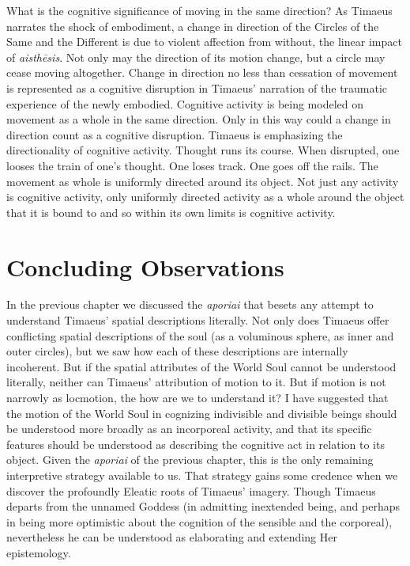 What is the cognitive significance of moving in the same direction? As Timaeus narrates the shock of embodiment, a change in direction of the Circles of the Same and the Different is due to violent affection from without, the linear impact of \emph{aisthēsis}. Not only may the direction of its motion change, but a circle may cease moving altogether. Change in direction no less than cessation of movement is represented as a cognitive disruption in Timaeus' narration of the traumatic experience of the newly embodied. Cognitive activity is being modeled on movement as a whole in the same direction. Only in this way could a change in direction count as a cognitive disruption. Timaeus is emphasizing the directionality of cognitive activity. Thought runs its course. When disrupted, one looses the train of one's thought. One loses track. One goes off the rails. The movement as whole is uniformly directed around its object. Not just any activity is cognitive activity, only uniformly directed activity as a whole around the object that it is bound to and so within its own limits is cognitive activity.


  



\section{Concluding Observations} %
\label{sec:concluding_observations_cr}

In the previous chapter we discussed the \emph{aporiai} that besets any attempt to understand Timaeus' spatial descriptions literally. Not only does Timaeus offer conflicting spatial descriptions of the soul (as a voluminous sphere, as inner and outer circles), but we saw how each of these descriptions are internally incoherent. But if the spatial attributes of the World Soul cannot be understood literally, neither can Timaeus' attribution of motion to it. But if motion is not narrowly as locmotion, the how are we to understand it? I have suggested that the motion of the World Soul in cognizing indivisible and divisible beings should be understood more broadly as an incorporeal activity, and that its specific features should be understood as describing the cognitive act in relation to its object. Given the \emph{aporiai} of the previous chapter, this is the only remaining interpretive strategy available to us. That strategy gains some credence when we discover the profoundly Eleatic roots of Timaeus' imagery. Though Timaeus departs from the unnamed Goddess (in admitting inextended being, and perhaps in being more optimistic about the cognition of the sensible and the corporeal), nevertheless he can be understood as elaborating and extending Her epistemology.


